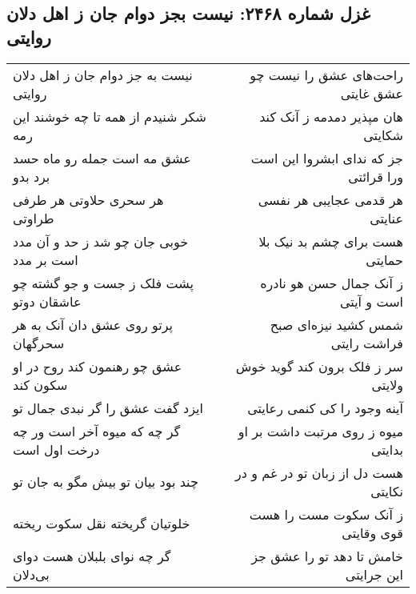 \begin{center}
\section*{غزل شماره ۲۴۶۸: نیست بجز دوام جان ز اهل دلان روایتی}
\label{sec:2468}
\begin{longtable}{l p{0.5cm} r}
نیست به جز دوام جان ز اهل دلان روایتی
&&
راحت‌های عشق را نیست چو عشق غایتی
\\
شکر شنیدم از همه تا چه خوشند این رمه
&&
هان مپذیر دمدمه ز آنک کند شکایتی
\\
عشق مه است جمله رو ماه حسد برد بدو
&&
جز که ندای ابشروا این است ورا قرائتی
\\
هر سحری حلاوتی هر طرفی طراوتی
&&
هر قدمی عجایبی هر نفسی عنایتی
\\
خوبی جان چو شد ز حد و آن مدد است بر مدد
&&
هست برای چشم بد نیک بلا حمایتی
\\
پشت فلک ز جست و جو گشته چو عاشقان دوتو
&&
ز آنک جمال حسن هو نادره است و آیتی
\\
پرتو روی عشق دان آنک به هر سحرگهان
&&
شمس کشید نیزه‌ای صبح فراشت رایتی
\\
عشق چو رهنمون کند روح در او سکون کند
&&
سر ز فلک برون کند گوید خوش ولایتی
\\
ایزد گفت عشق را گر نبدی جمال تو
&&
آینه وجود را کی کنمی رعایتی
\\
گر چه که میوه آخر است ور چه درخت اول است
&&
میوه ز روی مرتبت داشت بر او بدایتی
\\
چند بود بیان تو بیش مگو به جان تو
&&
هست دل از زبان تو در غم و در نکایتی
\\
خلوتیان گریخته نقل سکوت ریخته
&&
ز آنک سکوت مست را هست قوی وقایتی
\\
گر چه نوای بلبلان هست دوای بی‌دلان
&&
خامش تا دهد تو را عشق جز این جرایتی
\\
\end{longtable}
\end{center}
